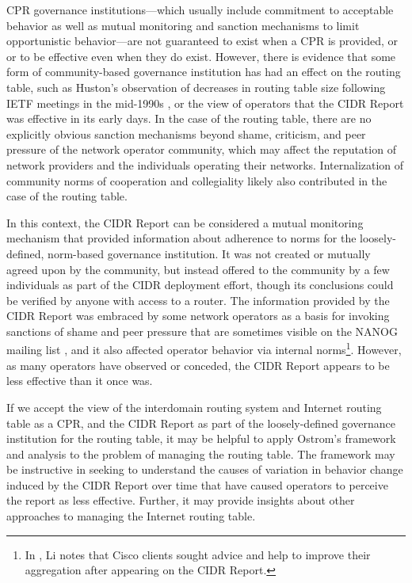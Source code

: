 CPR governance institutions---which usually include commitment to acceptable
behavior as well as mutual monitoring and sanction mechanisms to limit
opportunistic behavior---are not guaranteed to exist when a CPR is provided, or
or to be effective even when they do exist. However, there is evidence that
some form of community-based governance institution has had an effect on the
routing table, such as Huston's observation of decreases in routing table size
following IETF meetings in the mid-1990s \cite{Huston:2001bs,Clayton:2010bh},
or the view of operators that the CIDR Report was effective in its early days.
In the case of the routing table, there are no explicitly obvious sanction
mechanisms beyond shame, criticism, and peer pressure of the network operator
community, which may affect the reputation of network providers and the
individuals operating their networks. Internalization of community norms of
cooperation and collegiality \cite{Abbate:2000ve} likely also contributed in
the case of the routing table.

In this context, the CIDR Report can be considered a mutual monitoring
mechanism that provided information about adherence to norms for the
loosely-defined, norm-based governance institution. It was not created or
mutually agreed upon by the community, but instead offered to the community by
a few individuals as part of the CIDR deployment effort, though its conclusions
could be verified by anyone with access to a router. The information provided
by the CIDR Report was embraced by some network operators as a basis for
invoking sanctions of shame and peer pressure that are sometimes visible on the
NANOG mailing list \cite{NANOG}, and it also affected operator behavior via
internal norms\footnote{In \cite{Li:2011vn}, Li notes that Cisco clients sought
advice and help to improve their aggregation after appearing on the CIDR
Report.}. However, as many operators have observed or conceded, the CIDR Report
appears to be less effective than it once was.

If we accept the view of the interdomain routing system and Internet routing
table as a CPR, and the CIDR Report as part of the loosely-defined governance
institution for the routing table, it may be helpful to apply Ostrom's
framework and analysis to the problem of managing the routing table. The
framework may be instructive in seeking to understand the causes of variation
in behavior change induced by the CIDR Report over time that have caused
operators to perceive the report as less effective. Further, it may provide
insights about other approaches to managing the Internet routing table.

